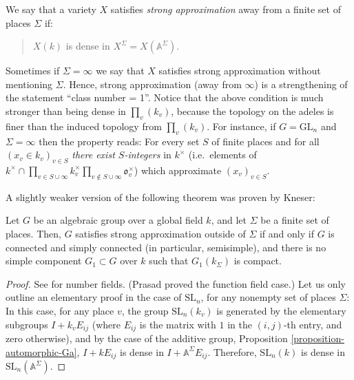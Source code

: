 \begin{definition}
 \label{definition-strong-approximation}
We say that a variety $X$ satisfies {\it strong approximation} away from a finite set of places $\Sigma$ if:
\begin{quote}
 $X(k)$ is dense in $X^\Sigma=X(\mathbb A^\Sigma)$. 
\end{quote}
Sometimes if $\Sigma=\infty$ we say that $X$ satisfies strong approximation without mentioning $\Sigma$. Hence, strong approximation (away from $\infty$) is a strengthening of the statement ``class number = 1''. Notice that the above condition is much stronger than being dense in $\prod_v(k_v)$, because the topology on the adeles is finer than the induced topology from $\prod_v(k_v)$. For instance, if $G=\text{GL}_n$ and $\Sigma=\infty$ then the property reads: For every set $S$ of finite places and for all $(x_v\in k_v)_{v\in S}$ \emph{there exist $S$-integers} in $k^\times$ (i.e.\ elements of $k^\times\cap \prod_{v\in S\cup\infty} k_v^\times \prod_{v\notin S\cup\infty} \mathfrak o_v^\times$) which approximate $(x_v)_{v\in S}$. 
 
\end{definition}



A slightly weaker version of the following theorem was proven by Kneser:
\begin{theorem}
\label{theorem-strong-approximation}
 Let $G$ be an algebraic group over a global field $k$, and let $\Sigma$ be a finite set of places. Then, $G$ satisfies strong approximation outside of $\Sigma$ if and only if $G$ is connected and simply connected (in particular, semisimple), and there is no simple component $G_1\subset G$ over $k$ such that $G_1(k_\Sigma)$ is compact.
\end{theorem}

\begin{proof}
 See \cite[\S 7.4]{Platonov-Rapinchuk} for number fields. (Prasad proved the function field case.) Let us only outline an elementary proof in the case of $\text{SL}_n$, for any nonempty set of places $\Sigma$: In this case, for any place $v$, the group $\text{SL}_n(k_v)$ is generated by the elementary subgroups $I+ k_v E_{ij}$ (where $E_{ij}$ is the matrix with $1$ in the $(i,j)$-th entry, and zero otherwise), and by the case of the additive group, Proposition \ref{proposition-automorphic-Ga}, $I+kE_{ij}$ is dense in $I+ \mathbb A^\Sigma E_{ij}$. Therefore, $\text{SL}_n(k)$ is dense in $\text{SL}_n(\mathbb A^\Sigma)$. 
\end{proof}



